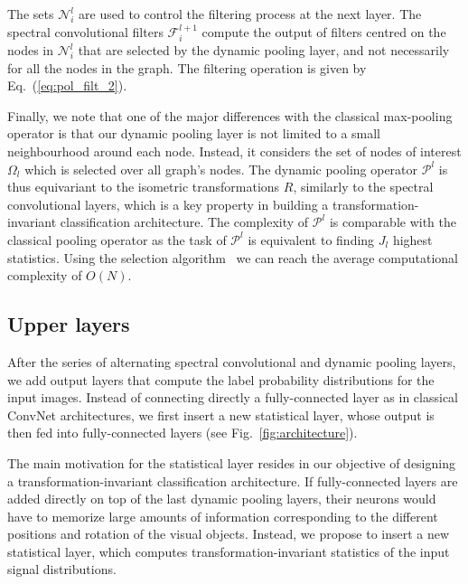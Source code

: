 \documentclass[10pt,journal,compsoc]{IEEEtran}
\newcommand{\renata}[1]{\textcolor{black}{#1}}
\begin{document}
	The sets $\mathcal{N}_i^{l}$ are used to control the filtering process at the next layer. The spectral convolutional filters $\mathcal{F}_i^{l+1}$ compute the output of filters centred on the nodes in $\mathcal{N}_i^{l}$ that are selected by the dynamic pooling layer, and not necessarily for all the nodes in the graph. The filtering operation is given by Eq.~(\ref{eq:pol_filt_2}).


	Finally, we note that one of the major differences with the classical max-pooling operator is that our dynamic pooling layer is not limited to a small neighbourhood around each node. Instead, it considers the set of nodes of interest $\Omega_l$ which is selected over all graph's nodes. The dynamic pooling operator $\mathcal{P}^{l}$ is thus equivariant to the isometric transformations $R$, similarly to the spectral convolutional layers, which is a key property in building a transformation-invariant classification architecture. The complexity of  $\mathcal{P}^l$ is comparable with the classical pooling operator as the task of $\mathcal{P}^l$ is equivalent to finding $J_l$ highest statistics. Using the selection algorithm~\cite{bb:Knuth98} we can reach the average computational complexity of $O(N)$.

	\subsection{Upper layers}
	\label{s:hist}

	After the series of alternating spectral convolutional and dynamic pooling layers, we add output layers that compute the label probability distributions for the input images. Instead of connecting directly a fully-connected layer as in classical ConvNet architectures, we first insert a new statistical layer, whose output is then fed into fully-connected layers (see Fig.~\ref{fig:architecture}).

	The main motivation for the statistical layer resides in our objective of designing a transformation-invariant classification architecture. If fully-connected layers are added directly on top of the last dynamic pooling layers, their neurons would have to memorize large amounts of information corresponding to the different positions and rotation of the visual objects. Instead, we propose to insert a new statistical layer, which computes transformation-invariant statistics of the input signal distributions.
\end{document}
